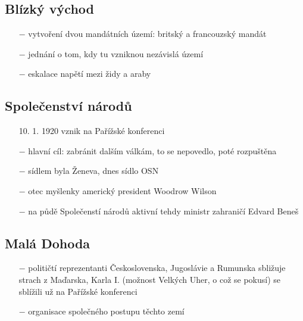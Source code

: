 \documentclass{article}
\begin{document}
\subsection*{Blízký východ}
\begin{itemize}
    \vspace{-0.5em}
    \setlength\itemsep{0.15em}
    \item[$-$] vytvoření dvou mandátních území: britský a francouzský mandát
    \item[$-$] jednání o tom, kdy tu vzniknou nezávislá území
    \item[$-$] eskalace napětí mezi židy a araby
\end{itemize}

\subsection*{Společenství národů}
\begin{itemize}
    \vspace{-0.5em}
    \setlength\itemsep{0.15em}
    \item[10. 1. 1920] vznik na Pařížské konferenci
    \item[$-$] hlavní cíl: zabránit dalším válkám, to se nepovedlo, poté rozpuštěna
    \item[$-$] sídlem byla Ženeva, dnes sídlo OSN
    \item[$-$] otec myšlenky americký president Woodrow Wilson
    \item[$-$] na půdě Společenstí národů aktivní tehdy ministr zahraničí Edvard Beneš
\end{itemize}

\subsection*{Malá Dohoda}
\begin{itemize}
    \vspace{-0.5em}
    \setlength\itemsep{0.15em}
    \item[$-$] političtí reprezentanti Československa, Jugoslávie a Rumunska sbližuje strach z Maďarska, Karla I. (možnost Velkých Uher, o což se pokusí) se sblížili už na Pařížské konferenci
    \item[$-$] organisace společného postupu těchto zemí
\end{itemize}
\end{document}

